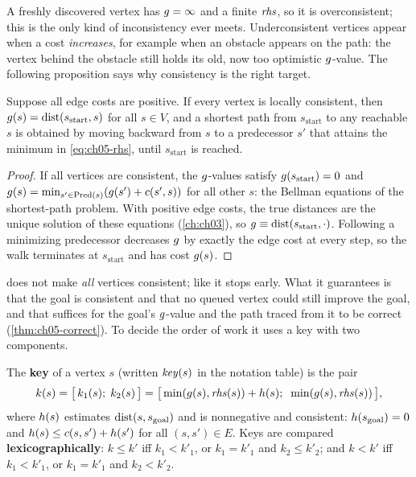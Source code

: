 A freshly discovered vertex has $g=\infty$ and a finite $\mathit{rhs}$, so it is
overconsistent; this is the only kind of inconsistency \astar ever meets. Underconsistent
vertices appear when a cost \emph{increases}, for example when an obstacle appears on
the path: the vertex behind the obstacle still holds its old, now too optimistic
$g$-value. The following proposition says why consistency is the right target.

\begin{proposition}
\label{thm:ch05-consistent-correct}
Suppose all edge costs are positive. If every vertex is locally consistent, then
$g(s) = \operatorname{dist}(s_{\mathrm{start}}, s)$ for all $s \in V$, and a shortest path from
$s_{\mathrm{start}}$ to any reachable $s$ is obtained by moving backward from $s$ to a
predecessor $s'$ that attains the minimum in \cref{eq:ch05-rhs}, until
$s_{\mathrm{start}}$ is reached.
\end{proposition}
\begin{proof}
If all vertices are consistent, the $g$-values satisfy $g(s_{\mathrm{start}})=0$
and $g(s)=\min_{s'\in\operatorname{Pred}(s)}(g(s')+c(s',s))$ for all other $s$: the Bellman
equations of the shortest-path problem. With positive edge costs, the true distances are
the unique solution of these equations (\cref{ch:ch03}), so $g \equiv \operatorname{dist}(s_{\mathrm{start}},\cdot)$.
Following a minimizing predecessor decreases $g$ by exactly the edge cost at every
step, so the walk terminates at $s_{\mathrm{start}}$ and has cost $g(s)$.
\end{proof}

\lpastar does not make \emph{all} vertices consistent; like \astar it stops early. What
it guarantees is that the goal is consistent and that no queued vertex could still
improve the goal, and that suffices for the goal's $g$-value and the path traced
from it to be correct (\cref{thm:ch05-correct}). To decide the order of work it uses a
key with two components.

\begin{definition}
\label{def:ch05-key}
The \textbf{key} of a vertex $s$ (written
$\mathit{key}(s)$ in the notation table) is the pair
\begin{equation}
\label{eq:ch05-key}
k(s) = \bigl[\,k_1(s);\; k_2(s)\,\bigr] =
\bigl[\,\min(g(s),\mathit{rhs}(s)) + h(s);\;\; \min(g(s),\mathit{rhs}(s))\,\bigr],
\end{equation}
where $h(s)$ estimates $\operatorname{dist}(s,s_{\mathrm{goal}})$ and is nonnegative and
consistent: $h(s_{\mathrm{goal}})=0$ and $h(s)\le c(s,s')+h(s')$ for all
$(s,s')\in E$. Keys are compared \textbf{lexicographically}: $k \le k'$ iff $k_1 < k'_1$,
or $k_1 = k'_1$ and $k_2 \le k'_2$; and $k < k'$ iff $k_1 < k'_1$, or $k_1 = k'_1$ and
$k_2 < k'_2$.
\end{definition}

